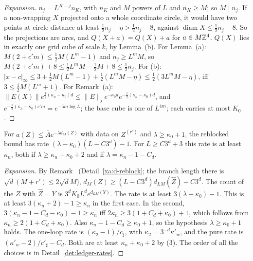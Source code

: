 \begin{proof}[Expansion]
$n_j=L^{K-j}n_K$, with $n_K$ and $M$ powers of $L$ and $n_K\ge M$; so $M\mid n_j$. If a non-wrapping $X$ projected onto a whole coordinate circle, it would have two points at circle distance at least $\frac12n_j-\eta>\frac12n_j-8$, against $\operatorname{diam}X\le\frac12n_j-8$. So the projections are arcs, and $Q(X+a)=Q(X)+a$ for $a\in M\mathbb Z^4$. $Q(X)$ lies in exactly one grid cube of scale $k$, by Lemma~(b). For Lemma~(a): $M(2+c'm)\le\frac12M(L^m-1)$ and $n_j\ge L^mM$, so $M(2+c'm)+8\le\frac12L^mM-\frac12M+8\le\frac12n_j$. For (b): $|x-c|_\infty\le3+\frac12M(L^m-1)+\frac12(L^mM-\eta)\le\frac12(3L^mM-\eta)$, iff $3\le\frac12M(L^m+1)$. For Remark~(a): $\|E(X)\|e^{\frac12(\kappa_n-\kappa_0)d}\le\|E\|_je^{-\kappa_0d}e^{-\frac12(\kappa_n-\kappa_0)d}$, and $e^{-\frac12(\kappa_n-\kappa_0)c'm}=e^{-5m\log L}$; the base cube is one of $L^{4m}$; each carries at most $K_0$.
\end{proof}

\begin{detail}\label{xb:d-rates}
For $a(Z)\le\bar Ae^{-\lambda d_M(Z)}$ with data on $Z^{(r')}$ and $\lambda\ge\kappa_0+1$, the reblocked bound has rate $(\lambda-\kappa_0)(L-C3^d)-1$. For $L\ge C3^d+3$ this rate is at least $\kappa_n$, both if $\lambda\ge\kappa_n+\kappa_0+2$ and if $\lambda=\kappa_n-1-C_d$.
\end{detail}

\begin{proof}[Expansion]
By Remark~ (Detail~\ref{xa:d-reblock}; the branch length there is $\sqrt d(M+r')\le2\sqrt dM$), $d_M(Z)\ge(L-C3^d)d_{LM}(\hat Z)-C3^d$. The count of the $Z$ with $\hat Z=Y$ is $3^dK_0L^de^{d_{LM}(Y)}$. The rate is at least $3(\lambda-\kappa_0)-1$. This is at least $3(\kappa_n+2)-1\ge\kappa_n$ in the first case. In the second, $3(\kappa_n-1-C_d-\kappa_0)-1\ge\kappa_n$ iff $2\kappa_n\ge3(1+C_d+\kappa_0)+1$, which follows from $\kappa_n\ge2(1+C_d+\kappa_0)$. Also $\kappa_n-1-C_d\ge\kappa_0+1$, so the hypothesis $\lambda\ge\kappa_0+1$ holds. The one-loop rate is $(\kappa_2-1)/c_\sharp$, with $\kappa_2=3^{-d}\kappa'_w$, and the pure rate is $(\kappa'_w-2)/c'_\sharp-C_d$. Both are at least $\kappa_n+\kappa_0+2$ by (3). The order of all the choices is in Detail~\ref{det:ledger-rates}.
\end{proof}

